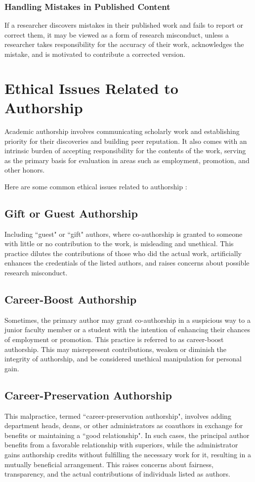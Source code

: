 \documentclass{article}
\begin{document}
	\subsubsection{Handling Mistakes in Published Content}
	If a researcher discovers mistakes in their published work and fails to report or correct them, it may be
	viewed as a form of research misconduct, unless a researcher takes responsibility for the accuracy of their
	work, acknowledges the mistake, and is motivated to contribute a corrected version.

	\section{Ethical Issues Related to Authorship}
	Academic authorship involves communicating scholarly work and establishing priority for their discoveries
	and building peer reputation.
	It also comes with an intrinsic burden of accepting responsibility for the contents of the work, serving as
	the primary basis for evaluation in areas such as employment, promotion, and other honors.

	\noindent Here are some common ethical issues related to authorship :
	
	\subsection{Gift or Guest Authorship}
	Including ``guest" or ``gift" authors, where co-authorship is granted to someone with little or no
	contribution to the work, is misleading and unethical.
	This practice dilutes the contributions of those who did the actual work, artificially enhances the
	credentials of the listed authors, and raises concerns about possible research misconduct.

	\subsection{Career-Boost Authorship}
	Sometimes, the primary author may grant co-authorship in a suspicious way to a junior faculty member or a
	student with the intention of enhancing their chances of employment or promotion.
	This practice is referred to as career-boost authorship.
	This may misrepresent contributions, weaken or diminish the integrity of authorship, and be considered
	unethical manipulation for personal gain.

	\subsection{Career-Preservation Authorship}
	This malpractice, termed ``career-preservation authorship", involves adding department heads, deans, or
	other administrators as coauthors in exchange for benefits or maintaining a ``good relationship".
	In such cases, the principal author benefits from a favorable relationship with superiors, while the
	administrator gains authorship credits without fulfilling the necessary work for it, resulting in a
	mutually beneficial arrangement.
	This raises concerns about fairness, transparency, and the actual contributions of individuals listed as
	authors.
\end{document}
